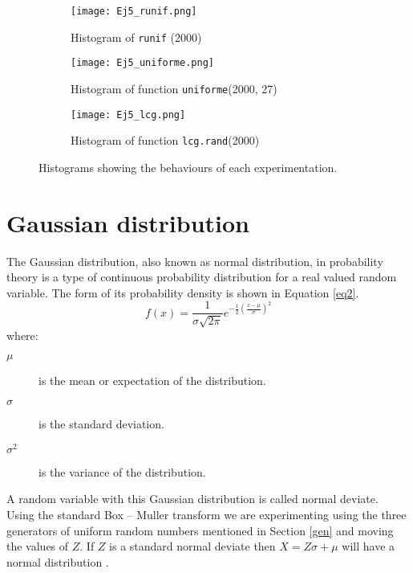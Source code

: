 \documentclass{article}
\begin{document}
\begin{figure}[]
\begin{subfigure}{.33\textwidth}
  \centering
  \texttt{[image: Ej5\_runif.png]}  
  \caption{Histogram of \texttt{runif} (2000) }
  \label{subfig1-1}
\end{subfigure}
\begin{subfigure}{.33\textwidth}
  \centering
  \texttt{[image: Ej5\_uniforme.png]}  
  \caption{Histogram of function \texttt{uniforme}(2000, 27)}
  \label{subfig1-2}
\end{subfigure}
\begin{subfigure}{.33\textwidth}
  \centering
  \texttt{[image: Ej5\_lcg.png]}  
  \caption{Histogram of function \texttt{lcg.rand}(2000)}
  \label{subfig1-3}
\end{subfigure}
\caption{Histograms showing the behaviours of each experimentation.}
\label{fig1}
\end{figure}

\clearpage


\section{Gaussian distribution}

The Gaussian distribution, also known as normal distribution, in probability theory is a type of continuous probability distribution for a real valued random variable. The form of its probability density is shown in Equation \ref{eq2}. \\

\begin{equation} \label{eq2}
f(x) = \frac{1}{\sigma\sqrt{2 \pi}}e^{-\frac{1}{2} \left(\frac{x-\mu}{\sigma}\right)^2 }
\end{equation}
where:
\begin{description}
\item[\textit{$\mu$}] is the mean or expectation of the distribution.
\item[\textit{$\sigma$}] is the standard deviation.
\item[\textit{$\sigma^2$}] is the variance of the distribution.
\end{description}

A random variable with this Gaussian distribution is called normal deviate. \\

Using the standard Box -- Muller transform we are experimenting using the three generators of uniform random numbers mentioned in Section \ref{gen} and moving the values of $Z$. If $Z$ is a standard normal deviate then $X=Z\sigma + \mu$ will have a normal distribution \cite{muller}. \\
\end{document}
